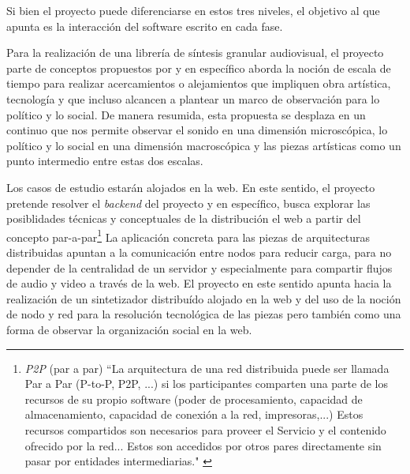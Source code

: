 Si bien el proyecto puede diferenciarse en estos tres niveles, el objetivo al que apunta es la interacción del software escrito en cada fase.

Para la realización de una librería de síntesis granular audiovisual, el proyecto parte de conceptos propuestos por \cite{microsound} y en específico aborda la noción de escala de tiempo para realizar acercamientos o alejamientos que impliquen obra artística, tecnología y que incluso alcancen a plantear un marco de observación para lo político y lo social. De manera resumida, esta propuesta se desplaza en un continuo que nos permite observar el sonido en una dimensión microscópica, lo político y lo social en una dimensión macroscópica y las piezas artísticas como un punto intermedio entre estas dos escalas. 

Los casos de estudio estarán alojados en la web. En este sentido, el proyecto pretende resolver el \textit{backend} del proyecto y en específico, busca explorar las posiblidades técnicas y conceptuales de la distribución el web a partir del concepto par-a-par\footnote{\textit{P2P} (par a par) ``La arquitectura de una red distribuida puede ser llamada Par a Par (P-to-P, P2P, ...)   si los participantes comparten una parte de los recursos de su propio software (poder de procesamiento, capacidad de almacenamiento, capacidad de conexión a la red, impresoras,...) Estos recursos compartidos son necesarios para proveer el Servicio y el contenido ofrecido por la red... Estos son accedidos por otros pares directamente sin pasar por entidades intermediarias." \citep{p2p}} La aplicación concreta para las piezas de arquitecturas distribuidas apuntan a la comunicación entre nodos para reducir carga, para no depender de la centralidad de un servidor y especialmente para compartir flujos de audio y video a través de la web. El proyecto en este sentido apunta hacia la realización de un sintetizador distribuído alojado en la web y del uso de la noción de nodo y red para la resolución tecnológica de las piezas pero también como una forma de observar la organización social en la web. 
